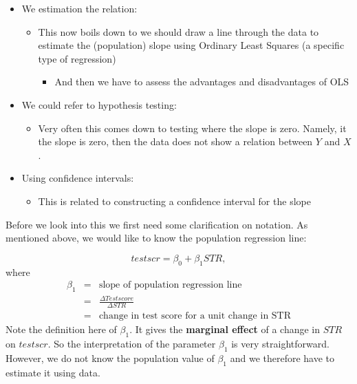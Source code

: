 \documentclass[
]{book}
\providecommand{\tightlist}{%
  \setlength{\itemsep}{0pt}\setlength{\parskip}{0pt}}
\begin{document}
\begin{itemize}
\tightlist
\item
  We estimation the relation:

  \begin{itemize}
  \tightlist
  \item
    This now boils down to we should draw a line through the data to estimate the (population) slope using Ordinary Least Squares (a specific type of regression)

    \begin{itemize}
    \tightlist
    \item
      And then we have to assess the advantages and disadvantages of OLS
    \end{itemize}
  \end{itemize}
\item
  We could refer to hypothesis testing:

  \begin{itemize}
  \tightlist
  \item
    Very often this comes down to testing where the slope is zero. Namely, it the slope is zero, then the data does not show a relation between \(Y\) and \(X\).
  \end{itemize}
\item
  Using confidence intervals:

  \begin{itemize}
  \tightlist
  \item
    This is related to constructing a confidence interval for the slope
  \end{itemize}
\end{itemize}

Before we look into this we first need some clarification on notation. As mentioned above, we would like to know the population regression line:

\begin{equation}
testscr = \beta_0 + \beta_1 STR,
\end{equation}
where
\begin{eqnarray}
    \beta_1& =& \text{slope of population regression line} \\
    &=&   \frac{\Delta Testscore}{\Delta STR}\\
    &=& \text{change in test score for a unit change in STR}
\end{eqnarray}
Note the definition here of \(\beta_1\). It gives the \textbf{marginal effect} of a change in \(STR\) on \(testscr\). So the interpretation of the parameter \(\beta_1\) is very straightforward. However, we do not know the population value of \(\beta_1\) and we therefore have to estimate it using data.
\end{document}

